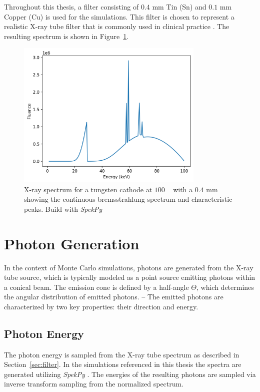 Throughout this thesis, a filter consisting of $0.4$ \si{\milli\meter} Tin (Sn)
and $0.1$ \si{\milli\meter} Copper (Cu) is used for the simulations. This filter
is chosen to represent a realistic X-ray tube filter that is commonly used in
clinical practice \cite{steidel2022dose}. The resulting spectrum is shown in
Figure~\ref{fig:spectrum100kvp_with_filter}.

\begin{figure}[H]
    \centering
    \includegraphics[width=0.8\textwidth]{Figures/spectrum_with_filter.png}
    \caption{X-ray spectrum for a tungsten cathode at $100$ \si{\kilo\voltpeak}
    with a $0.4$ \si{\milli\meter} showing the continuous bremsstrahlung
    spectrum and characteristic peaks. Build with \emph{SpekPy} \cite{spekpy}}
    \label{fig:spectrum100kvp_with_filter}
\end{figure}


\section{Photon Generation}

In the context of Monte Carlo simulations, photons are generated from the X-ray
tube source, which is typically modeled as a point source emitting photons
within a conical beam. The emission cone is defined by a half-angle $\Theta$,
which determines the angular distribution of emitted photons. -- The emitted photons are characterized by two key properties: their direction and
energy. 

\subsection*{Photon Energy}
The photon energy is sampled from the X-ray tube spectrum as described in
Section~\ref{sec:filter}. In the simulations referenced in this thesis the
spectra are generated utilizing \emph{SpekPy} \cite{spekpy,
poludniowski2021spekpy}. The energies of the resulting photons are sampled via
inverse transform sampling from the normalized spectrum.

